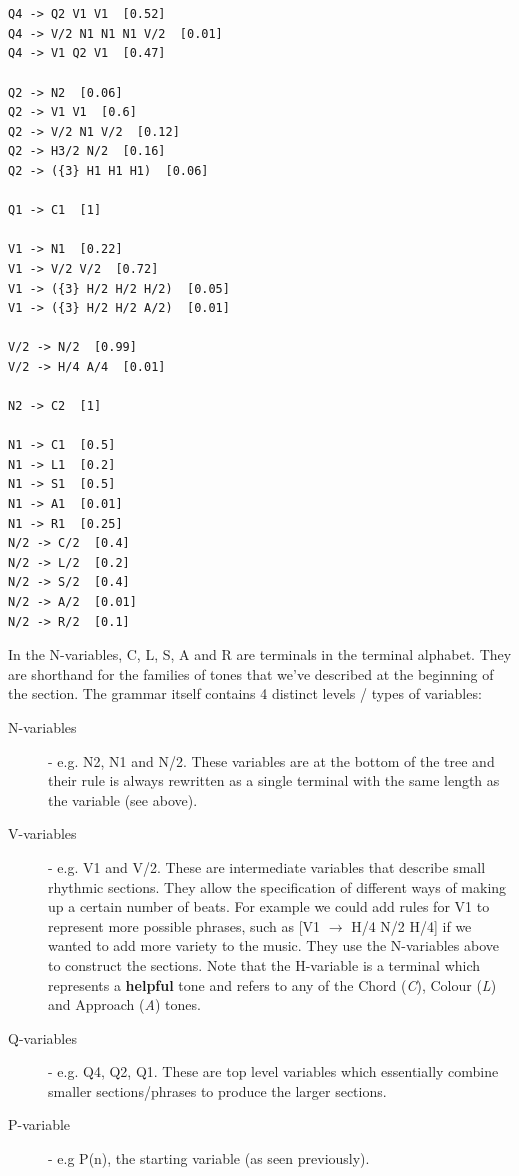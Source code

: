 \documentclass[pdftex,12pt,a4paper]{report}
\begin{document}
\begin{verbatim}


Q4 -> Q2 V1 V1  [0.52]
Q4 -> V/2 N1 N1 N1 V/2  [0.01]
Q4 -> V1 Q2 V1  [0.47]

Q2 -> N2  [0.06]
Q2 -> V1 V1  [0.6]
Q2 -> V/2 N1 V/2  [0.12]
Q2 -> H3/2 N/2  [0.16]
Q2 -> ({3} H1 H1 H1)  [0.06]

Q1 -> C1  [1]

V1 -> N1  [0.22]
V1 -> V/2 V/2  [0.72]
V1 -> ({3} H/2 H/2 H/2)  [0.05]
V1 -> ({3} H/2 H/2 A/2)  [0.01]

V/2 -> N/2  [0.99]
V/2 -> H/4 A/4  [0.01]

N2 -> C2  [1]

N1 -> C1  [0.5]
N1 -> L1  [0.2]
N1 -> S1  [0.5]
N1 -> A1  [0.01]
N1 -> R1  [0.25]
N/2 -> C/2  [0.4]
N/2 -> L/2  [0.2]
N/2 -> S/2  [0.4]
N/2 -> A/2  [0.01]
N/2 -> R/2  [0.1]

\end{verbatim}

In the N-variables, C, L, S, A and R are terminals in the terminal alphabet. They are shorthand for the families of tones that we've described at the beginning of the section. The grammar itself contains 4 distinct levels / types of variables:

\begin{description}
  \item[N-variables] - e.g. N2, N1 and N/2. These variables are at the bottom of the tree and their rule is always rewritten as a single terminal with the same length as the variable (see above).
  \item[V-variables]  - e.g. V1 and V/2. These are intermediate variables that describe small rhythmic sections. They allow the specification of different ways of making up a certain number of beats. For example we could add rules for V1 to represent more possible phrases, such as [V1 $\rightarrow$ H/4 N/2 H/4] if we wanted to add more variety to the music. They use the N-variables above to construct the sections. Note that the H-variable is a terminal which represents a \textbf{helpful} tone and refers to any of the Chord (\textit{C}), Colour (\textit{L}) and Approach (\textit{A}) tones.
  \item[Q-variables] - e.g. Q4, Q2, Q1. These are top level variables which essentially combine smaller sections/phrases to produce the larger sections. 
  \item[P-variable] - e.g P(n), the starting variable (as seen previously).
\end{description}
\end{document}
